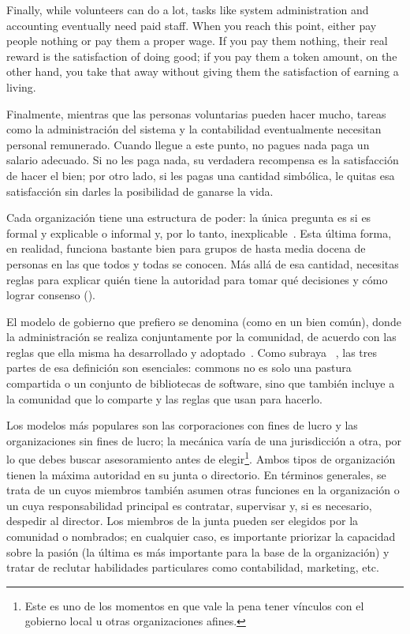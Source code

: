 Finally, 
while volunteers can do a lot,
tasks like system administration and accounting eventually need paid staff.
When you reach this point,
either pay people nothing or pay them a proper wage.
If you pay them nothing,
their real reward is the satisfaction of doing good;
if you pay them a token amount,
on the other hand,
you take that away without giving them the satisfaction of earning a living.

Finalmente,
mientras que las personas voluntarias pueden hacer mucho, 
tareas como la administración del sistema y la contabilidad eventualmente necesitan personal remunerado.
Cuando llegue a este punto, no pagues nada paga un salario adecuado.
Si no les paga nada, su verdadera recompensa es la satisfacción de hacer el bien;
por otro lado, si les pagas una cantidad simbólica, le quitas esa satisfacción sin darles la posibilidad de ganarse la vida.


Cada organización tiene una estructura de poder:
la única pregunta es si es formal y explicable o informal y, por lo tanto, inexplicable~\cite{Free1972}.
Esta última forma, en realidad, funciona bastante bien para grupos de hasta media docena de personas 
en las que todos y todas se conocen.
Más allá de esa cantidad, 
necesitas reglas para explicar 
quién tiene la autoridad para tomar qué decisiones 
y cómo lograr consenso ().

El modelo de gobierno que prefiero se denomina  (como en un bien común),
donde la administración se realiza conjuntamente por la comunidad, de acuerdo con las reglas que ella misma ha desarrollado y adoptado~\cite{Ostr2015}.
Como subraya ~\cite{Boll2014}, las tres partes de esa definición son esenciales:
commons no es solo una pastura compartida o un conjunto de bibliotecas de software, 
sino que también incluye a la comunidad que lo comparte y las reglas que usan para hacerlo.

Los modelos más populares son las corporaciones con fines de lucro y las organizaciones sin fines de lucro; 
la mecánica varía de una jurisdicción a otra, 
por lo que debes buscar asesoramiento antes de elegir\footnote{
  Este es uno de los momentos 
  en que vale la pena tener vínculos con el gobierno local u otras organizaciones afines.}.
Ambos tipos de organización tienen la máxima autoridad en su junta o directorio.
En términos generales, se trata de un  
cuyos miembros también asumen otras funciones en la organización 
o un  cuya responsabilidad principal es contratar, supervisar 
y, si es necesario, despedir al director.
Los miembros de la junta pueden ser elegidos por la comunidad o nombrados; 
en cualquier caso, es importante priorizar la capacidad sobre la pasión 
(la última es más importante para la base de la organización) 
y tratar de reclutar habilidades particulares como contabilidad, marketing, etc.

